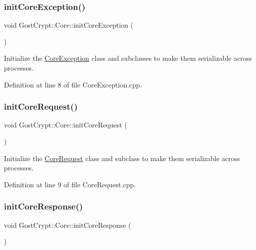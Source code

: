 \subsubsection{\texorpdfstring{init\+Core\+Exception()}{initCoreException()}}
{\footnotesize\ttfamily void Gost\+Crypt\+::\+Core\+::init\+Core\+Exception (\begin{DoxyParamCaption}{ }\end{DoxyParamCaption})}



Initialize the \hyperlink{class_gost_crypt_1_1_core_1_1_core_exception}{Core\+Exception} class and subclasses to make them serializable across processes. 



Definition at line 8 of file Core\+Exception.\+cpp.

\mbox{\label{namespace_gost_crypt_1_1_core_a13d7cc8bb97825d89645dbfec1894b0d}} 
\subsubsection{\texorpdfstring{init\+Core\+Request()}{initCoreRequest()}}
{\footnotesize\ttfamily void Gost\+Crypt\+::\+Core\+::init\+Core\+Request (\begin{DoxyParamCaption}{ }\end{DoxyParamCaption})}



Initialize the \hyperlink{struct_gost_crypt_1_1_core_1_1_core_request}{Core\+Request} class and subclass to make them serializable across processes. 



Definition at line 9 of file Core\+Request.\+cpp.

\mbox{\label{namespace_gost_crypt_1_1_core_a53ceac5fcd668c0bbf3f58a69f62fef9}} 
\subsubsection{\texorpdfstring{init\+Core\+Response()}{initCoreResponse()}}
{\footnotesize\ttfamily void Gost\+Crypt\+::\+Core\+::init\+Core\+Response (\begin{DoxyParamCaption}{ }\end{DoxyParamCaption})}



